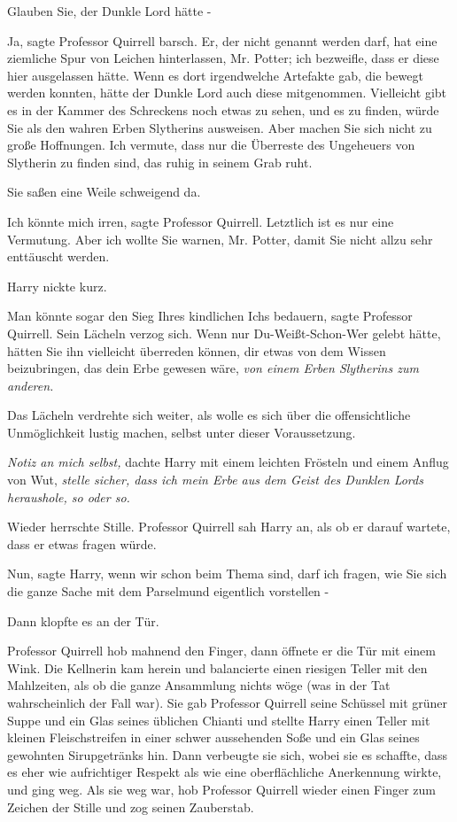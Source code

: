 \glqq{}Glauben Sie, der Dunkle Lord hätte -\grqq{}

\glqq{}Ja\grqq{}, sagte Professor Quirrell barsch. \glqq{}Er, der nicht genannt
werden darf, hat eine ziemliche Spur von Leichen hinterlassen, Mr. Potter; ich
bezweifle, dass er diese hier ausgelassen hätte. Wenn es dort irgendwelche
Artefakte gab, die bewegt werden konnten, hätte der Dunkle Lord auch diese
mitgenommen. Vielleicht gibt es in der Kammer des Schreckens noch etwas zu
sehen, und es zu finden, würde Sie als den wahren Erben Slytherins ausweisen.
Aber machen Sie sich nicht zu große Hoffnungen. Ich vermute, dass nur die
Überreste des Ungeheuers von Slytherin zu finden sind, das ruhig in seinem Grab
ruht.\grqq{}

Sie saßen eine Weile schweigend da.

\glqq{}Ich könnte mich irren\grqq{}, sagte Professor Quirrell. \glqq{}Letztlich
ist es nur eine Vermutung. Aber ich wollte Sie warnen, Mr. Potter, damit Sie
nicht allzu sehr enttäuscht werden.\grqq{}

Harry nickte kurz.

\glqq{}Man könnte sogar den Sieg Ihres kindlichen Ichs bedauern\grqq{}, sagte
Professor Quirrell. Sein Lächeln verzog sich. \glqq{}Wenn nur Du-Weißt-Schon-Wer
gelebt hätte, hätten Sie ihn vielleicht überreden können, dir etwas von dem
Wissen beizubringen, das dein Erbe gewesen wäre, \emph{von einem Erben
Slytherins zum anderen.}\grqq{}

Das Lächeln verdrehte sich weiter, als wolle es sich über die offensichtliche
Unmöglichkeit lustig machen, selbst unter dieser Voraussetzung.

\emph{Notiz an mich selbst,} dachte Harry mit einem leichten Frösteln und einem
Anflug von Wut,\emph{ stelle sicher, dass ich mein Erbe aus dem Geist des
Dunklen Lords heraushole, so oder so.}

Wieder herrschte Stille. Professor Quirrell sah Harry an, als ob er darauf
wartete, dass er etwas fragen würde.

\glqq{}Nun\grqq{}, sagte Harry, \glqq{}wenn wir schon beim Thema sind, darf ich
fragen, wie Sie sich die ganze Sache mit dem Parselmund eigentlich vorstellen -\grqq{}

Dann klopfte es an der Tür.

Professor Quirrell hob mahnend den Finger, dann öffnete er die Tür mit einem
Wink. Die Kellnerin kam herein und balancierte einen riesigen Teller mit den
Mahlzeiten, als ob die ganze Ansammlung nichts wöge (was in der Tat
wahrscheinlich der Fall war). Sie gab Professor Quirrell seine Schüssel mit
grüner Suppe und ein Glas seines üblichen Chianti und stellte Harry einen Teller
mit kleinen Fleischstreifen in einer schwer aussehenden Soße und ein Glas seines
gewohnten Sirupgetränks hin. Dann verbeugte sie sich, wobei sie es schaffte,
dass es eher wie aufrichtiger Respekt als wie eine oberflächliche Anerkennung
wirkte, und ging weg. Als sie weg war, hob Professor Quirrell wieder einen
Finger zum Zeichen der Stille und zog seinen Zauberstab.

